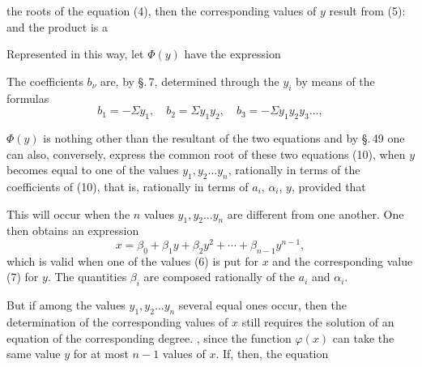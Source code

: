 
the roots of the equation (4), then the corresponding values of $y$ result from (5):
and the product
is a 

Represented in this way, let $\Phi(y)$ have the expression

The coefficients $b_\nu$ are, by \S.\,7, determined through the $y_i$ by means of the formulas
\[
b_1 = -\Sigma y_1, \quad b_2 = \Sigma y_1 y_2, \quad b_3 = -\Sigma y_1 y_2 y_3 \ldots,
\]

$\Phi(y)$ is nothing other than the resultant of the two equations
and by \S.\,49 one can also, conversely, express the common root of these two equations (10), when $y$ becomes equal to one of the values $y_1, y_2 \ldots y_n$, rationally in terms of the coefficients of (10), that is, rationally in terms of $a_i$, $\alpha_i$, $y$, provided that 

This will occur when the $n$ values $y_1, y_2 \ldots y_n$ are different from one another. One then obtains an expression
\[
x = \beta_0 + \beta_1 y + \beta_2 y^2 + \cdots + \beta_{n-1} y^{n-1},
\]
which is valid when one of the values (6) is put for $x$ and the corresponding value (7) for $y$. The quantities $\beta_i$ are composed rationally of the $a_i$ and $\alpha_i$.

But if among the values $y_1, y_2 \ldots y_n$ several equal ones occur, then the determination of the corresponding values of $x$ still requires the solution of an equation of the corresponding degree. , since the function $\varphi(x)$ can take the same value $y$ for at most $n-1$ values of $x$. If, then, the equation
